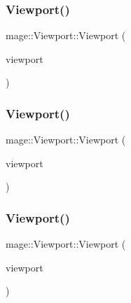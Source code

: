 \subsubsection{\texorpdfstring{Viewport()}{Viewport()}\hspace{0.1cm}{\footnotesize\ttfamily [3/5]}}
{\footnotesize\ttfamily mage\+::\+Viewport\+::\+Viewport (\begin{DoxyParamCaption}\item[{D3\+D11\+\_\+\+V\+I\+E\+W\+P\+O\+RT \&\&}]{viewport }\end{DoxyParamCaption})\hspace{0.3cm}{\ttfamily [explicit]}}

\hypertarget{structmage_1_1_viewport_ae94d36685270b07e64730aa4eaad8d66}{}\label{structmage_1_1_viewport_ae94d36685270b07e64730aa4eaad8d66} 
\subsubsection{\texorpdfstring{Viewport()}{Viewport()}\hspace{0.1cm}{\footnotesize\ttfamily [4/5]}}
{\footnotesize\ttfamily mage\+::\+Viewport\+::\+Viewport (\begin{DoxyParamCaption}\item[{const \hyperlink{structmage_1_1_viewport}{Viewport} \&}]{viewport }\end{DoxyParamCaption})\hspace{0.3cm}{\ttfamily [default]}}

\hypertarget{structmage_1_1_viewport_a314686e3b925a4158418a98ba28c4fc6}{}\label{structmage_1_1_viewport_a314686e3b925a4158418a98ba28c4fc6} 
\subsubsection{\texorpdfstring{Viewport()}{Viewport()}\hspace{0.1cm}{\footnotesize\ttfamily [5/5]}}
{\footnotesize\ttfamily mage\+::\+Viewport\+::\+Viewport (\begin{DoxyParamCaption}\item[{\hyperlink{structmage_1_1_viewport}{Viewport} \&\&}]{viewport }\end{DoxyParamCaption})\hspace{0.3cm}{\ttfamily [default]}}


